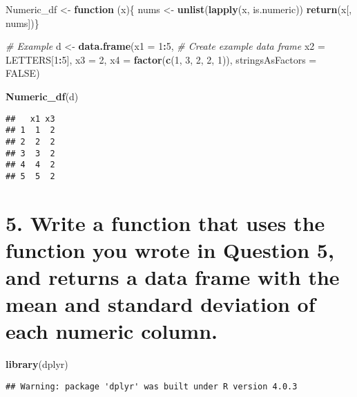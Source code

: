 \documentclass[
]{article}
\newenvironment{Shaded}{\begin{snugshade}}{\end{snugshade}}
\newcommand{\CommentTok}[1]{\textcolor[rgb]{0.56,0.35,0.01}{\textit{#1}}}
\newcommand{\ControlFlowTok}[1]{\textcolor[rgb]{0.13,0.29,0.53}{\textbf{#1}}}
\newcommand{\DataTypeTok}[1]{\textcolor[rgb]{0.13,0.29,0.53}{#1}}
\newcommand{\DecValTok}[1]{\textcolor[rgb]{0.00,0.00,0.81}{#1}}
\newcommand{\KeywordTok}[1]{\textcolor[rgb]{0.13,0.29,0.53}{\textbf{#1}}}
\newcommand{\NormalTok}[1]{#1}
\newcommand{\OperatorTok}[1]{\textcolor[rgb]{0.81,0.36,0.00}{\textbf{#1}}}
\newcommand{\OtherTok}[1]{\textcolor[rgb]{0.56,0.35,0.01}{#1}}
\newcommand{\StringTok}[1]{\textcolor[rgb]{0.31,0.60,0.02}{#1}}
\begin{document}
\begin{Shaded}
\begin{Highlighting}[]
\NormalTok{Numeric_df <-}\StringTok{ }\ControlFlowTok{function}\NormalTok{ (x)\{}
\NormalTok{nums <-}\StringTok{ }\KeywordTok{unlist}\NormalTok{(}\KeywordTok{lapply}\NormalTok{(x, is.numeric))  }
\KeywordTok{return}\NormalTok{(x[, nums])\}}

\CommentTok{# Example}
\NormalTok{d <-}\StringTok{ }\KeywordTok{data.frame}\NormalTok{(}\DataTypeTok{x1 =} \DecValTok{1}\OperatorTok{:}\DecValTok{5}\NormalTok{,                         }\CommentTok{# Create example data frame}
                   \DataTypeTok{x2 =}\NormalTok{ LETTERS[}\DecValTok{1}\OperatorTok{:}\DecValTok{5}\NormalTok{],}
                   \DataTypeTok{x3 =} \DecValTok{2}\NormalTok{,}
                   \DataTypeTok{x4 =} \KeywordTok{factor}\NormalTok{(}\KeywordTok{c}\NormalTok{(}\DecValTok{1}\NormalTok{, }\DecValTok{3}\NormalTok{, }\DecValTok{2}\NormalTok{, }\DecValTok{2}\NormalTok{, }\DecValTok{1}\NormalTok{)),}
                   \DataTypeTok{stringsAsFactors =} \OtherTok{FALSE}\NormalTok{)}

\KeywordTok{Numeric_df}\NormalTok{(d)}
\end{Highlighting}
\end{Shaded}

\begin{verbatim}
##   x1 x3
## 1  1  2
## 2  2  2
## 3  3  2
## 4  4  2
## 5  5  2
\end{verbatim}

\hypertarget{write-a-function-that-uses-the-function-you-wrote-in-question-5-and-returns-a-data-frame-with-the-mean-and-standard-deviation-of-each-numeric-column.}{%
\section{5. Write a function that uses the function you wrote in
Question 5, and returns a data frame with the mean and standard
deviation of each numeric
column.}\label{write-a-function-that-uses-the-function-you-wrote-in-question-5-and-returns-a-data-frame-with-the-mean-and-standard-deviation-of-each-numeric-column.}}

\begin{Shaded}
\begin{Highlighting}[]
\KeywordTok{library}\NormalTok{(dplyr)}
\end{Highlighting}
\end{Shaded}

\begin{verbatim}
## Warning: package 'dplyr' was built under R version 4.0.3
\end{verbatim}
\end{document}
